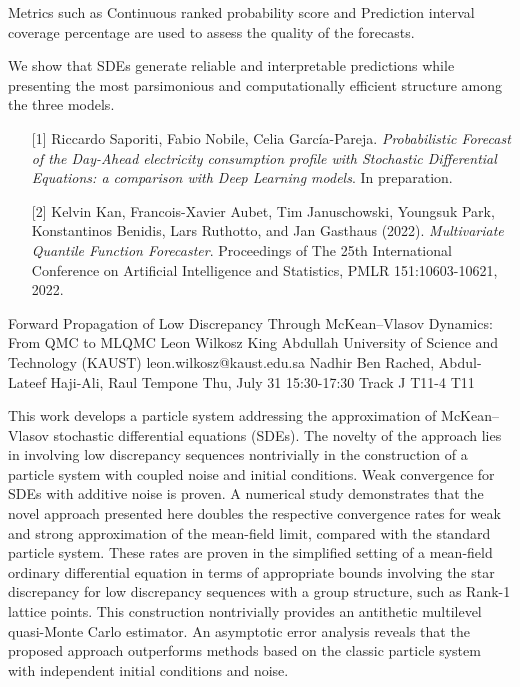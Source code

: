 \begin{talk}
Metrics such as Continuous ranked probability score and Prediction interval coverage percentage are used to assess the quality of the forecasts. 

We show that SDEs generate reliable and interpretable predictions while presenting the most parsimonious and computationally efficient structure among the three models.


\medskip

 

\begin{enumerate}
    \item[{[1]}] Riccardo Saporiti, Fabio Nobile, Celia García-Pareja. {\it Probabilistic Forecast of the Day-Ahead electricity consumption profile with Stochastic Differential Equations: a comparison with Deep Learning models}. In preparation.

	\item[{[2]}] Kelvin Kan, Francois-Xavier Aubet, Tim Januschowski, Youngsuk Park, Konstantinos Benidis, Lars Ruthotto, and Jan Gasthaus (2022). {\it Multivariate Quantile Function Forecaster}. Proceedings of The 25th International Conference on Artificial Intelligence and Statistics, PMLR 151:10603-10621, 2022.
 
\end{enumerate}
 
\end{talk}

\begin{talk}
  {Forward Propagation of Low Discrepancy Through McKean--Vlasov Dynamics: From QMC to MLQMC}%
  {Leon Wilkosz}%
  {King Abdullah University of Science and Technology (KAUST)}%
  {leon.wilkosz@kaust.edu.sa}%
  {Nadhir Ben Rached, Abdul-Lateef Haji-Ali, Raul Tempone}%
  {}%
  {Thu, July 31 15:30-17:30 Track J}%
  {T11-4}%
  {T11}%
  
				
			
This work develops a particle system addressing the approximation of \linebreak McKean--Vlasov stochastic differential equations (SDEs). The novelty of the approach lies in involving low discrepancy sequences nontrivially in the construction of a particle system with coupled noise and initial conditions. Weak convergence for SDEs with additive noise is proven. A numerical study demonstrates that the novel approach presented here doubles the respective convergence rates for weak and strong approximation of the mean-field limit, compared with the standard particle system. These rates are proven in the simplified setting of a mean-field ordinary differential equation in terms of appropriate bounds involving the star discrepancy for low discrepancy sequences with a group structure, such as Rank-1 lattice points. This construction nontrivially provides an antithetic multilevel quasi-Monte Carlo estimator. An asymptotic error analysis reveals that the proposed approach outperforms methods based on the classic particle system with independent initial conditions and noise.
\end{talk}


